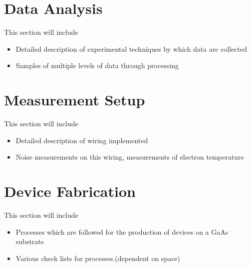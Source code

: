 \chapter{Data Analysis}
This section will include 
\begin{itemize}
\item Detailed description of experimental techniques by which data are collected
\item Samples of multiple levels of data through processing
\end{itemize}

\chapter{Measurement Setup}
This section will include 
\begin{itemize}
\item Detailed description of wiring implemented
\item Noise measurements on this wiring, measurements of electron temperature
\end{itemize}

\chapter{Device Fabrication}
This section will include 
\begin{itemize}
\item Processes which are followed for the production of devices on a GaAs substrate
\item Various check lists for processes.(dependent on space)
\end{itemize}
